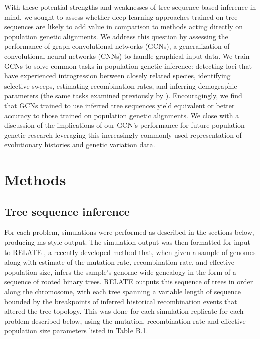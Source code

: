 With these potential strengths and weaknesses of tree sequence-based inference in mind, we sought to assess whether deep learning approaches trained on tree sequences are likely to add value in comparison to methods acting directly on population genetic alignments. We address this question by assessing the performance of graph convolutional networks (GCNs), a generalization of convolutional neural networks (CNNs) to handle graphical input data. We train GCNs to solve common tasks in population genetic inference: detecting loci that have experienced introgression between closely related species, identifying selective sweeps, estimating recombination rates, and inferring demographic parameters (the same tasks examined previously by \cite{flagelUnreasonableEffectivenessConvolutional2019}). Encouragingly, we find that GCNs trained to use inferred tree sequences yield equivalent or better accuracy to those trained on population genetic alignments. We close with a discussion of the implications of our GCN's performance for future population genetic research leveraging this increasingly commonly used representation of evolutionary histories and genetic variation data.


\section{Methods}

\subsection{Tree sequence inference}

For each problem, simulations were performed as described in the sections below, producing ms-style output. The simulation output was then formatted for input to RELATE \cite{speidelMethodGenomewideGenealogy2019a}, a recently developed method that, when given a sample of genomes along with estimate of the mutation rate, recombination rate, and effective population size, infers the sample's genome-wide genealogy in the form of a sequence of rooted binary trees. RELATE outputs this sequence of trees in order along the chromosome, with each tree spanning a variable length of sequence bounded by the breakpoints of inferred historical recombination events that altered the tree topology. This was done for each simulation replicate for each problem described below, using the mutation, recombination rate and effective population size parameters listed in Table B.1. 

